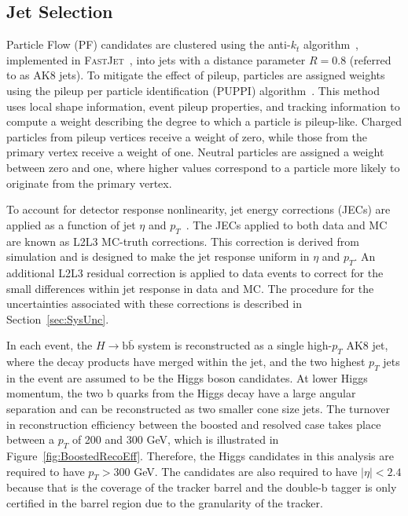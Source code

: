 \subsection{Jet Selection}

Particle Flow (PF) candidates are clustered using the anti-$k_{t}$ algorithm~\cite{antikt}, implemented in \textsc{FastJet}~\cite{FastJet}, into jets with a distance parameter $R=0.8$ (referred to as AK8 jets). To mitigate the effect of pileup, particles are assigned weights using the pileup per particle identification (PUPPI) algorithm~\cite{PUPPI}. This method uses local shape information, event pileup properties, and tracking information to compute a weight describing the degree to which a particle is pileup-like. Charged particles from pileup vertices receive a weight of zero, while those from the primary vertex receive a weight of one. Neutral particles are assigned a weight between zero and one, where higher values correspond to a particle more likely to originate from the primary vertex.

To account for detector response nonlinearity, jet energy corrections (JECs) are applied as a function of jet $\eta$ and $p_{T}$~\cite{JEC, JEC2}. The JECs applied to both data and MC are known as L2L3 MC-truth corrections. This correction is derived from simulation and is designed to make the jet response uniform in $\eta$ and $p_{T}$. An additional L2L3 residual correction is applied to data events to correct for the small differences within jet response in data and MC. The procedure for the uncertainties associated with these corrections is described in Section~\ref{sec:SysUnc}. 

In each event, the $H\rightarrow \mathrm{b\bar{b}}$ system is reconstructed as a single high-$p_{T}$ AK8 jet, where the decay products have merged within the jet, and the two highest $p_{T}$ jets in the event are assumed to be the Higgs boson candidates. At lower Higgs momentum, the two b quarks from the Higgs decay have a large angular separation and can be reconstructed as two smaller cone size jets. The turnover in reconstruction efficiency between the boosted and resolved case takes place between a $p_{T}$ of 200 and 300 GeV, which is illustrated in Figure~\ref{fig:BoostedRecoEff}. Therefore, the Higgs candidates in this analysis are required to have $p_{T} > 300$ GeV. The candidates are also required to have $|\eta| < 2.4$ because that is the coverage of the tracker barrel and the double-b tagger is only certified in the barrel region due to the granularity of the tracker. 

